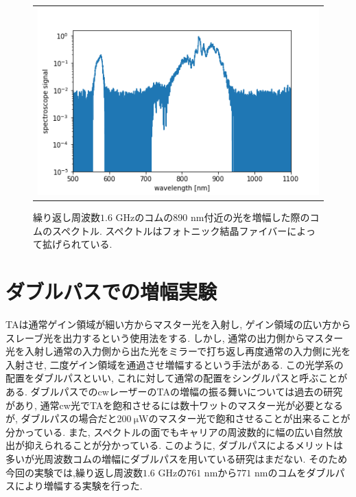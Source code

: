 \documentclass[uplatex, dvipdfmx, a4paper, report, papersize, 11pt]{jsbook}
\begin{document}
\begin{figure}[H]
  \centering
    \begin{tabular}{c}
      \begin{minipage}{1\hsize}
        \centering
          \includegraphics[keepaspectratio,  scale=0.5,  angle=0]
          {figures/chapter4/astro-890_comb.png}
          \caption{繰り返し周波数$1.6$ GHzのコムの$890$ nm付近の光を増幅した際のコムのスペクトル. スペクトルはフォトニック結晶ファイバーによって拡げられている. }
          \label{astro-890_comb}
      \end{minipage}
    \end{tabular}
\end{figure}

\section{ダブルパスでの増幅実験}

TAは通常ゲイン領域が細い方からマスター光を入射し, ゲイン領域の広い方からスレーブ光を出力するという使用法をする. しかし, 通常の出力側からマスター光を入射し通常の入力側から出た光をミラーで打ち返し再度通常の入力側に光を入射させ, 二度ゲイン領域を通過させ増幅するという手法がある. この光学系の配置をダブルパスといい, これに対して通常の配置をシングルパスと呼ぶことがある. ダブルパスでのcwレーザーのTAの増幅の振る舞いについては過去の研究\cite{doi:10.1063/1.3501966}があり, 通常cw光でTAを飽和させるには数十ワットのマスター光が必要となるが, ダブルパスの場合だと$200\ \mathrm{\mu W}$のマスター光で飽和させることが出来ることが分かっている. また, スペクトルの面でもキャリアの周波数的に幅の広い自然放出が抑えられることが分かっている. このように, ダブルパスによるメリットは多いが光周波数コムの増幅にダブルパスを用いている研究はまだない. そのため今回の実験では,繰り返し周波数$1.6$ GHzの$761$ nmから$771$ nmのコムをダブルパスにより増幅する実験を行った.
\end{document}
